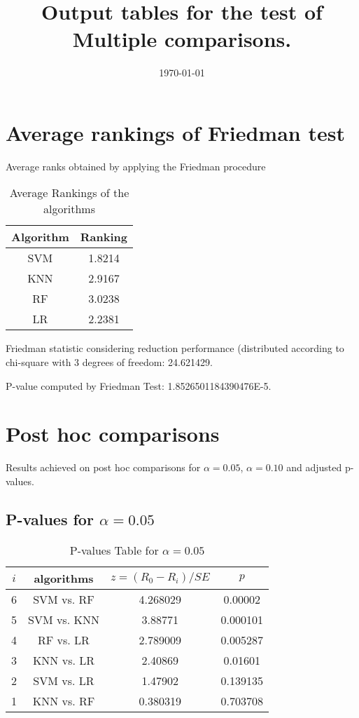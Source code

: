 \documentclass[a4paper,10pt]{article}
\title{Output tables for the test of Multiple comparisons.}
\author{}
\date{\today}
\begin{document}
\begin{landscape}
\pagestyle{empty}
\maketitle
\thispagestyle{empty}
\section{Average rankings of Friedman test}



Average ranks obtained by applying the Friedman procedure

\begin{table}[!htp]
\centering
\begin{tabular}{|c|c|}\hline
Algorithm&Ranking\\\hline
SVM & 1.8214\\
KNN & 2.9167\\
RF & 3.0238\\
LR & 2.2381\\
\hline
\end{tabular}
\caption{Average Rankings of the algorithms}
\end{table}

Friedman statistic considering reduction performance (distributed according to chi-square with 3 degrees of freedom: 24.621429.

P-value computed by Friedman Test: 1.8526501184390476E-5.\newline



\pagebreak

\section{Post hoc comparisons}

Results achieved on post hoc comparisons for $\alpha = 0.05$, $\alpha = 0.10$ and adjusted p-values.

\subsection{P-values for $\alpha=0.05$}

\begin{table}[!htp]
\centering\scriptsize
\begin{tabular}{cccc}
$i$&algorithms&$z=(R_0 - R_i)/SE$&$p$\\
\hline6&SVM vs. RF&4.268029&0.00002\\
5&SVM vs. KNN&3.88771&0.000101\\
4&RF vs. LR&2.789009&0.005287\\
3&KNN vs. LR&2.40869&0.01601\\
2&SVM vs. LR&1.47902&0.139135\\
1&KNN vs. RF&0.380319&0.703708\\
\hline
\end{tabular}
\caption{P-values Table for $\alpha=0.05$}
\end{table}\pagebreak


\end{landscape}
\end{document}
